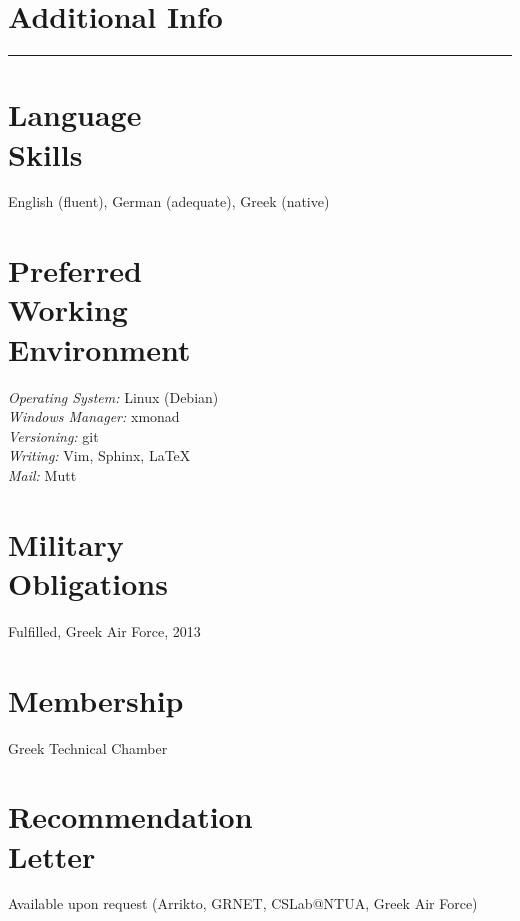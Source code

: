 \documentclass[margin,centered]{res}
\begin{document}
\begin{resume}
\section{Additional Info}
\rule[3pt]{\textwidth}{0.4pt}

\section{\sc Language\\Skills}
English (fluent), German (adequate), Greek (native)

\section{\sc Preferred\\Working\\Environment}
\textit{Operating System:} Linux (Debian)\\
\textit{Windows Manager:} xmonad\\
\textit{Versioning:} git\\
\textit{Writing:} Vim, Sphinx, \LaTeX\\
\textit{Mail:} Mutt

\section{\sc Military\\Obligations}
Fulfilled, Greek Air Force, 2013

\section{\sc Membership}
Greek Technical Chamber

%
\section{\sc Recommendation\\Letter}
Available upon request (Arrikto, GRNET, CSLab@NTUA, Greek Air Force)

\end{resume}

\def\enoteheading{\section{Notes}\rule[0pt]{\textwidth}{0.4pt}}
\parskip=2pt
\theendnotes
\end{document}
